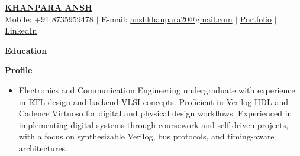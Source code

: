 \documentclass[letterpaper,11pt]{article}
\makeatletter
\newcommand{\resumeSubheading}[4]{
\item
\begin{tabular*}{0.97\textwidth}{l@{\extracolsep{\fill}}r}
\textbf{#1} & \textbf{#2} \\
\small #3 & \\
\end{tabular*}
}
\newcommand{\resheading}[1]{%
\vspace{6pt}
\noindent
\colorbox{mygrey}{%
  \parbox{\dimexpr\linewidth-2\fboxsep}{%
    \textbf{#1}
  }%
}
\par\vspace{4pt}
}
\makeatother
\begin{document}
\begin{center}
{\Large \textbf{\href{https://portfolio-sandy-six-56.vercel.app/}{KHANPARA ANSH}}} \\
\small Mobile: +91 8735959478 $|$
\small E-mail: \href{mailto:anshkhanpara20@gmail.com}{anshkhanpara20@gmail.com} $|$
\href{https://portfolio-sandy-six-56.vercel.app/}{Portfolio} $|$
\href{https://www.linkedin.com/in/ansh-khanpara-97993b350/}{LinkedIn}
\end{center}

\resheading{Education}

\resheading{Profile}
\begin{itemize}
\item \small{\justifying
Electronics and Communication Engineering undergraduate with experience in RTL design and backend VLSI concepts. Proficient in Verilog HDL and Cadence Virtuoso for digital and physical design workflows. Experienced in implementing digital systems through coursework and self-driven projects, with a focus on synthesizable Verilog, bus protocols, and timing-aware architectures.
}
\end{itemize}
\end{document}
